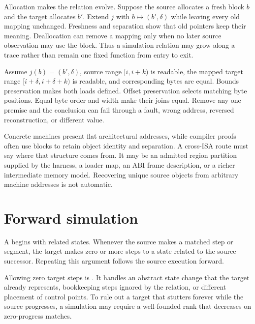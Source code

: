 Allocation makes the relation evolve. Suppose the source allocates a fresh
block \(b\) and the target allocates \(b'\). Extend \(j\) with
\(b\mapsto(b',\delta)\) while leaving every old mapping unchanged. Freshness
and separation show that old pointers keep their meaning. Deallocation can
remove a mapping only when no later source observation may use the block.
Thus a simulation relation may grow along a trace rather than remain one fixed
function from entry to exit.

\begin{proofkit}[title={A translated load preserves its word}]
Assume \(j(b)=(b',\delta)\), source range \([i,i+k)\) is readable, the mapped
target range \([i+\delta,i+\delta+k)\) is readable, and corresponding bytes
are equal. Bounds preservation makes both loads defined. Offset preservation
selects matching byte positions. Equal byte order and width make their joins
equal. Remove any one premise and the conclusion can fail through a fault,
wrong address, reversed reconstruction, or different value.
\end{proofkit}

Concrete machines present flat architectural addresses, while compiler proofs
often use blocks to retain object identity and separation. A cross-ISA route
must say where that structure comes from. It may be an admitted region
partition supplied by the harness, a loader map, an ABI frame description, or
a richer intermediate memory model. Recovering unique source objects from
arbitrary machine addresses is not automatic.

\section{Forward simulation}

A  begins with related states. Whenever the source
makes a matched step or segment, the target makes zero or more steps to a state
related to the source successor. Repeating this argument follows the source
execution forward.

Allowing zero target steps is . It handles an abstract
state change that the target already represents, bookkeeping steps ignored by
the relation, or different placement of control points. To rule out a target
that stutters forever while the source progresses, a simulation may require a
well-founded rank that decreases on zero-progress matches.

